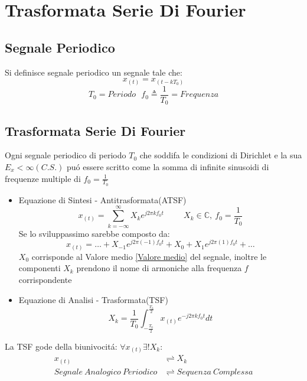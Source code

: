 \section{Trasformata Serie Di Fourier}
    \subsection{Segnale Periodico}
        Si definisce segnale periodico un segnale tale che:
        \[
            x_{(t)} = x_{(t-kT_0)}    
        \]
        \[
            T_0=Periodo\ \ \ f_0\triangleq \frac{1}{T_0} =Frequenza
        \]
    \subsection{Trasformata Serie Di Fourier}
        Ogni segnale periodico di periodo $T_0$ che soddifa le condizioni di Dirichlet e la sua $E_x < \infty (C.S.)$ puó essere scritto come la somma di 
        infinite sinusoidi di frequenze multiple di $f_0 = \frac{1}{T_0}$
        \begin{itemize}
            \item{Equazione di Sintesi - Antitrasformata(ATSF)\label{ATSF}
                \[
                    x_{(t)} = \sum_{k = -\infty}^{\infty} X_{k} e^{j2\pi kf_0t} \hspace{1cm} X_{k}\in \mathbb{C},\ f_0 = \frac{1}{T_0} 
                \]
                Se lo sviluppassimo sarebbe composto da:
                \[
                   x_{(t)} =\ldots  + X_{-1} e^{j2\pi (-1)f_0t} + X_{0} + X_{1} e^{j2\pi (1) f_0t} + \ldots 
                \]
                $X_0$ corrisponde al Valore medio \ref{Valore medio} del segnale, inoltre le componenti $X_k$ prendono il nome di armoniche alla frequenza $f$ corrispondente
            }
            \item{Equazione di Analisi - Trasformata(TSF)\label{TSF}
                \[
                    X_k =\frac{1}{T_0}\int_{-\frac{T_0}{2}}^{\frac{T_0}{2}} x_{(t)} e^{-j2\pi kf_0t} dt
                \]
            } 
        \end{itemize}
        La TSF gode della biunivocitá: $\forall x_{(t)} \exists! X_k$:
        \begin{align}
            x_{(t)} & \rightleftharpoons X_k  \nonumber\\
            Segnale\ Analogico\ Periodico &\rightleftharpoons Sequenza\ Complessa \nonumber
        \end{align}
